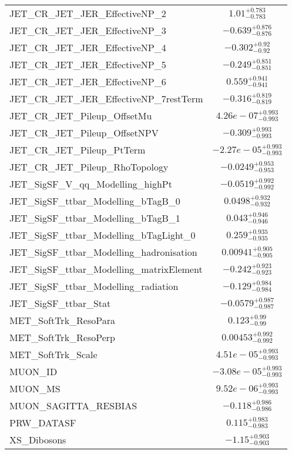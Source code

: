 \begin{tabular}{|l|c|}
JET\_CR\_JET\_JER\_EffectiveNP\_2 & $1.01^{+0.783}_{-0.783}$ \\
JET\_CR\_JET\_JER\_EffectiveNP\_3 & $-0.639^{+0.876}_{-0.876}$ \\
JET\_CR\_JET\_JER\_EffectiveNP\_4 & $-0.302^{+0.92}_{-0.92}$ \\
JET\_CR\_JET\_JER\_EffectiveNP\_5 & $-0.249^{+0.851}_{-0.851}$ \\
JET\_CR\_JET\_JER\_EffectiveNP\_6 & $0.559^{+0.941}_{-0.941}$ \\
JET\_CR\_JET\_JER\_EffectiveNP\_7restTerm & $-0.316^{+0.819}_{-0.819}$ \\
JET\_CR\_JET\_Pileup\_OffsetMu & $4.26e-07^{+0.993}_{-0.993}$ \\
JET\_CR\_JET\_Pileup\_OffsetNPV & $-0.309^{+0.993}_{-0.993}$ \\
JET\_CR\_JET\_Pileup\_PtTerm & $-2.27e-05^{+0.993}_{-0.993}$ \\
JET\_CR\_JET\_Pileup\_RhoTopology & $-0.0249^{+0.953}_{-0.953}$ \\
JET\_SigSF\_V\_qq\_Modelling\_highPt & $-0.0519^{+0.992}_{-0.992}$ \\
JET\_SigSF\_ttbar\_Modelling\_bTagB\_0 & $0.0498^{+0.932}_{-0.932}$ \\
JET\_SigSF\_ttbar\_Modelling\_bTagB\_1 & $0.043^{+0.946}_{-0.946}$ \\
JET\_SigSF\_ttbar\_Modelling\_bTagLight\_0 & $0.259^{+0.935}_{-0.935}$ \\
JET\_SigSF\_ttbar\_Modelling\_hadronisation & $0.00941^{+0.905}_{-0.905}$ \\
JET\_SigSF\_ttbar\_Modelling\_matrixElement & $-0.242^{+0.923}_{-0.923}$ \\
JET\_SigSF\_ttbar\_Modelling\_radiation & $-0.129^{+0.984}_{-0.984}$ \\
JET\_SigSF\_ttbar\_Stat & $-0.0579^{+0.987}_{-0.987}$ \\
MET\_SoftTrk\_ResoPara & $0.123^{+0.99}_{-0.99}$ \\
MET\_SoftTrk\_ResoPerp & $0.00453^{+0.992}_{-0.992}$ \\
MET\_SoftTrk\_Scale & $4.51e-05^{+0.993}_{-0.993}$ \\
MUON\_ID & $-3.08e-05^{+0.993}_{-0.993}$ \\
MUON\_MS & $9.52e-06^{+0.993}_{-0.993}$ \\
MUON\_SAGITTA\_RESBIAS & $-0.118^{+0.986}_{-0.986}$ \\
PRW\_DATASF & $0.115^{+0.983}_{-0.983}$ \\
XS\_Dibosons & $-1.15^{+0.903}_{-0.903}$ \\

\end{tabular}

